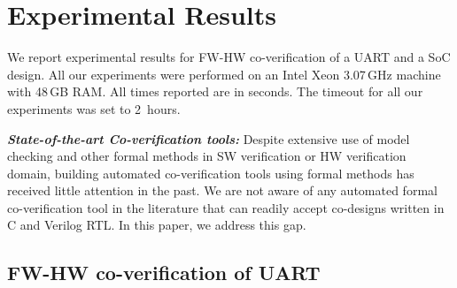 \documentclass[sigconf]{acmart}
\begin{document}
\section{Experimental Results}
%
We report experimental results for FW-HW co-verification of a UART  and a
SoC design.  All our experiments were performed on an Intel Xeon 3.07\,GHz
machine with 48\,GB RAM.  All times reported are in seconds.  The timeout 
for all our experiments was set to 2~hours.  
%

\textit{\textbf{State-of-the-art Co-verification tools:}} 
%
Despite extensive use of model checking and other formal methods in 
SW verification or HW verification domain, building automated 
co-verification tools using formal methods has received 
little attention in the past.  We are not aware of any automated 
formal co-verification tool in the literature that can readily accept 
co-designs written in C and Verilog RTL. In this paper, we address this gap. 
%
\subsection{FW-HW co-verification of UART}
\end{document}
